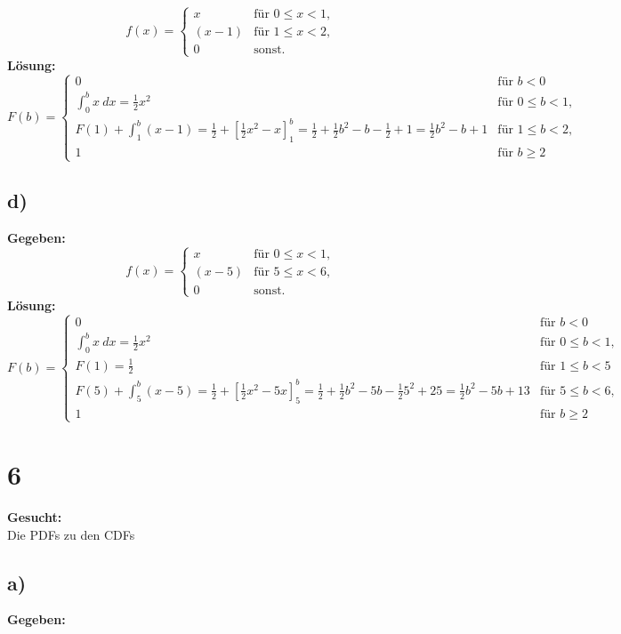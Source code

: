 \documentclass{article}
\begin{document}
\[
f(x) = \begin{cases}
    x & \text{für } 0 \leq x < 1, \\
    (x-1) & \text{für } 1 \leq x < 2, \\
    0 & \text{sonst.}
\end{cases}
\]
\textbf{Lösung:} \\
\[
F(b) = \begin{cases}
    0 & \text{für } b < 0 \\
    \int_{0}^{b}x ~dx = \frac{1}{2}x^{2} & \text{für } 0 \leq b < 1, \\
    F(1) + \int_{1}^{b} (x-1) = \frac{1}{2} + [\frac{1}{2}x^{2} -x]_{1}^{b} = \frac{1}{2} + \frac{1}{2}b^2 - b - \frac{1}{2} + 1 = \frac{1}{2}b^2 - b + 1   & \text{für } 1 \leq b < 2, \\
    1 & \text{für } b \geq 2
\end{cases}
\]

\subsection*{d)}
\textbf{Gegeben:} \\

\[
f(x) = \begin{cases}
    x & \text{für } 0 \leq x < 1, \\
    (x-5) & \text{für } 5 \leq x < 6, \\
    0 & \text{sonst.}
\end{cases}
\]
\textbf{Lösung:} \\
\[
F(b) = \begin{cases}
    0 & \text{für } b < 0 \\
    \int_{0}^{b}x ~dx = \frac{1}{2}x^{2} & \text{für } 0 \leq b < 1, \\
    F(1) = \frac{1}{2 } &\text{für } 1 \leq b < 5 \\
    F(5) + \int_{5}^{b} (x-5) = \frac{1}{2} + [\frac{1}{2}x^{2} - 5x]_{5}^{b} = \frac{1}{2} + \frac{1}{2}b^2 - 5b - \frac{1}{2}5^{2} + 25 = \frac{1}{2} b^2 - 5b + 13   & \text{für } 5 \leq b < 6, \\
    1 & \text{für } b \geq 2
\end{cases}
\]

\section*{6}
\textbf{Gesucht:} \\

Die PDFs zu den CDFs 
\subsection*{a)}
\textbf{Gegeben:} \\
\end{document}
